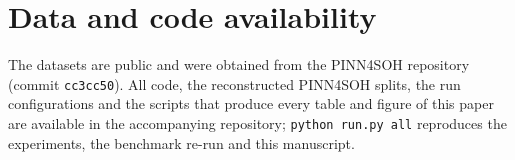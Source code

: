 \documentclass[11pt,a4paper]{article}
\begin{document}
\section*{Data and code availability}
The datasets are public and were obtained from the PINN4SOH repository (commit \texttt{cc3cc50}). All code, the
reconstructed PINN4SOH splits, the run configurations and the scripts that produce every table and figure of this paper
are available in the accompanying repository; \texttt{python run.py all} reproduces the experiments, the benchmark
re-run and this manuscript.



\end{document}
